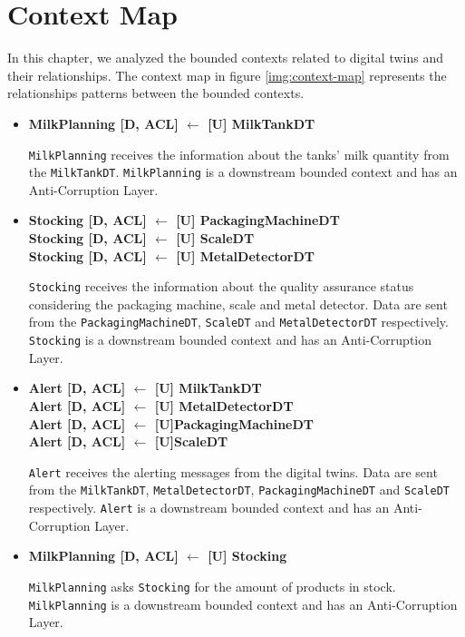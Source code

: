 \section{Context Map}
In this chapter, we analyzed the bounded contexts related to digital twins and their relationships.
The context map in figure \ref{img:context-map} represents the relationships patterns between the bounded contexts.

\begin{itemize}
    \item \textbf{MilkPlanning [D, ACL] $\leftarrow$ [U] MilkTankDT}
    
    \texttt{MilkPlanning} receives the information about the tanks' milk quantity from the \texttt{MilkTankDT}.
    \texttt{MilkPlanning} is a downstream bounded context and has an Anti-Corruption Layer.
    
    \item \textbf{Stocking [D, ACL] $\leftarrow$ [U] PackagingMachineDT \\ 
    Stocking [D, ACL] $\leftarrow$ [U] ScaleDT \\ 
    Stocking [D, ACL] $\leftarrow$ [U] MetalDetectorDT}

    \texttt{Stocking} receives the information about the quality assurance status considering the packaging machine, scale and metal detector. Data are sent from the \texttt{PackagingMachineDT}, \texttt{ScaleDT} and \texttt{MetalDetectorDT} respectively.
    \texttt{Stocking} is a downstream bounded context and has an Anti-Corruption Layer.
	
	\item \textbf{Alert [D, ACL] $\leftarrow$ [U] MilkTankDT \\
	Alert [D, ACL] $\leftarrow$ [U] MetalDetectorDT \\
	Alert [D, ACL] $\leftarrow$ [U]PackagingMachineDT \\
	Alert [D, ACL] $\leftarrow$ [U]ScaleDT}

    \texttt{Alert} receives the alerting messages from the digital twins. Data are sent from the \texttt{MilkTankDT}, \texttt{MetalDetectorDT}, \texttt{PackagingMachineDT} and \texttt{ScaleDT} respectively.
    \texttt{Alert} is a downstream bounded context and has an Anti-Corruption Layer.

    \item \textbf{MilkPlanning [D, ACL] $\leftarrow$  [U] Stocking} 
    
    \texttt{MilkPlanning} asks \texttt{Stocking} for the amount of products in stock.
    \texttt{MilkPlanning} is a downstream bounded context and has an Anti-Corruption Layer.


\end{itemize}
